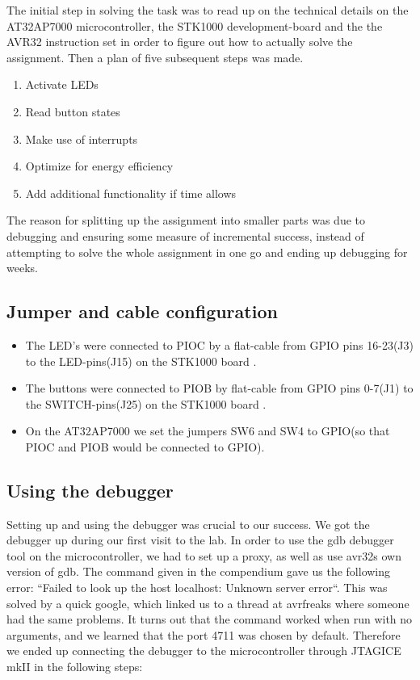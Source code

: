 The initial step in solving the task was to read up on the technical details on the AT32AP7000 \cite{ap7000} microcontroller, the STK1000 development-board and the the AVR32 instruction set \cite{avr32} in order to figure out how to actually solve the assignment. Then a plan of five subsequent steps was made.

\begin{enumerate}
\item Activate LEDs
\item Read button states
\item Make use of interrupts
\item Optimize for energy efficiency
\item Add additional functionality if time allows
\end{enumerate}

The reason for splitting up the assignment into smaller parts was due to debugging and ensuring some measure of incremental success, instead of attempting to solve the whole assignment in one go and ending up debugging for weeks.
\subsection{Jumper and cable configuration}


\begin{itemize}
\item The LED’s were connected to PIOC by a flat-cable from GPIO pins 16-23(J3) to the LED-pins(J15) on the STK1000 board \cite[section~2.4.1]{compendium}. 
\item The buttons were connected to PIOB by flat-cable from GPIO pins 0-7(J1) to the SWITCH-pins(J25) on the STK1000 board \cite[section~2.4.1]{compendium}.
\item On the AT32AP7000 we set the jumpers SW6 and SW4 to GPIO(so that PIOC and PIOB would be connected to GPIO)\cite[table~2.3]{compendium}.
\end{itemize}

\subsection{Using the debugger}

Setting up and using the debugger was crucial to our success. We got the debugger up during our first visit to the lab. In order to use the gdb debugger tool on the microcontroller, we had to set up a proxy, as well as use avr32s own version of gdb. The command given in the compendium\cite{compendium} gave us the following error: “Failed to look up the host localhost: 
Unknown server error“. This was solved by a quick google, which linked us to a thread at avrfreaks\cite{gdbforum} where someone had the same problems. It turns out that the command worked when run with no arguments, and we learned that the port 4711 was chosen by default. Therefore we ended up connecting the debugger to the microcontroller through JTAGICE mkII in the following steps:\\

